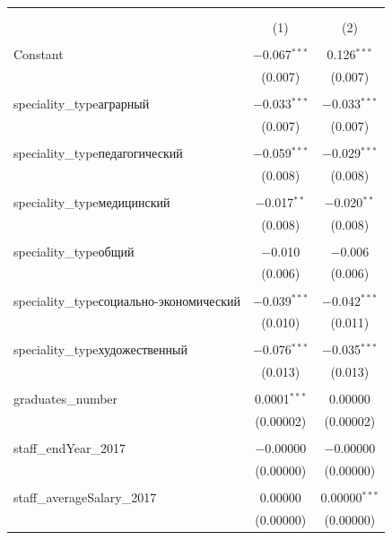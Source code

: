 \documentclass[alpha-refs]{wiley-article-05g}
\begin{document}
\begin{table}[!htbp] \centering 
	\caption{} 
	\label{} 
	\begin{tabular}{@{\extracolsep{5pt}}lcc} 
		\\[-1.8ex]\hline 
		\hline \\[-1.8ex] 
		\\[-1.8ex] & (1) & (2)\\ 
		\hline \\[-1.8ex] 
		Constant & $-$0.067$^{***}$ & 0.126$^{***}$ \\ 
		& (0.007) & (0.007) \\ 
		& & \\ 
		speciality\_typeаграрный & $-$0.033$^{***}$ & $-$0.033$^{***}$ \\ 
		& (0.007) & (0.007) \\ 
		& & \\ 
		speciality\_typeпедагогический & $-$0.059$^{***}$ & $-$0.029$^{***}$ \\ 
		& (0.008) & (0.008) \\ 
		& & \\ 
		speciality\_typeмедицинский & $-$0.017$^{**}$ & $-$0.020$^{**}$ \\ 
		& (0.008) & (0.008) \\ 
		& & \\ 
		speciality\_typeобщий & $-$0.010 & $-$0.006 \\ 
		& (0.006) & (0.006) \\ 
		& & \\ 
		speciality\_typeсоциально-экономический & $-$0.039$^{***}$ & $-$0.042$^{***}$ \\ 
		& (0.010) & (0.011) \\ 
		& & \\ 
		speciality\_typeхудожественный & $-$0.076$^{***}$ & $-$0.035$^{***}$ \\ 
		& (0.013) & (0.013) \\ 
		& & \\ 
		graduates\_number & 0.0001$^{***}$ & 0.00000 \\ 
		& (0.00002) & (0.00002) \\ 
		& & \\ 
		staff\_endYear\_2017 & $-$0.00000 & $-$0.00000 \\ 
		& (0.00000) & (0.00000) \\ 
		& & \\ 
		staff\_averageSalary\_2017 & 0.00000 & 0.00000$^{***}$ \\ 
		& (0.00000) & (0.00000) \\ 

\end{tabular}
\end{table}
\end{document}

